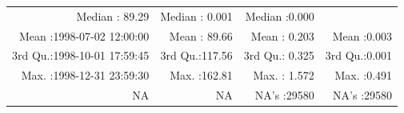 \documentclass[
  10pt,
  a4paper,oneside]{article}
\begin{document}
\begin{longtable}[]{@{}rrrr@{}}
\begin{minipage}[t]{0.19\columnwidth}
Median : 89.29\strut
\end{minipage} & \begin{minipage}[t]{0.19\columnwidth}\raggedleft
Median : 0.001\strut
\end{minipage} & \begin{minipage}[t]{0.19\columnwidth}\raggedleft
Median :0.000\strut
\end{minipage}\tabularnewline
\begin{minipage}[t]{0.33\columnwidth}\raggedleft
Mean :1998-07-02 12:00:00\strut
\end{minipage} & \begin{minipage}[t]{0.19\columnwidth}\raggedleft
Mean : 89.66\strut
\end{minipage} & \begin{minipage}[t]{0.19\columnwidth}\raggedleft
Mean : 0.203\strut
\end{minipage} & \begin{minipage}[t]{0.19\columnwidth}\raggedleft
Mean :0.003\strut
\end{minipage}\tabularnewline
\begin{minipage}[t]{0.33\columnwidth}\raggedleft
3rd Qu.:1998-10-01 17:59:45\strut
\end{minipage} & \begin{minipage}[t]{0.19\columnwidth}\raggedleft
3rd Qu.:117.56\strut
\end{minipage} & \begin{minipage}[t]{0.19\columnwidth}\raggedleft
3rd Qu.: 0.325\strut
\end{minipage} & \begin{minipage}[t]{0.19\columnwidth}\raggedleft
3rd Qu.:0.001\strut
\end{minipage}\tabularnewline
\begin{minipage}[t]{0.33\columnwidth}\raggedleft
Max. :1998-12-31 23:59:30\strut
\end{minipage} & \begin{minipage}[t]{0.19\columnwidth}\raggedleft
Max. :162.81\strut
\end{minipage} & \begin{minipage}[t]{0.19\columnwidth}\raggedleft
Max. : 1.572\strut
\end{minipage} & \begin{minipage}[t]{0.19\columnwidth}\raggedleft
Max. :0.491\strut
\end{minipage}\tabularnewline
\begin{minipage}[t]{0.33\columnwidth}\raggedleft
NA\strut
\end{minipage} & \begin{minipage}[t]{0.19\columnwidth}\raggedleft
NA\strut
\end{minipage} & \begin{minipage}[t]{0.19\columnwidth}\raggedleft
NA's :29580\strut
\end{minipage} & \begin{minipage}[t]{0.19\columnwidth}\raggedleft
NA's :29580\strut
\end{minipage}\tabularnewline
\bottomrule
\end{longtable}
\end{document}
